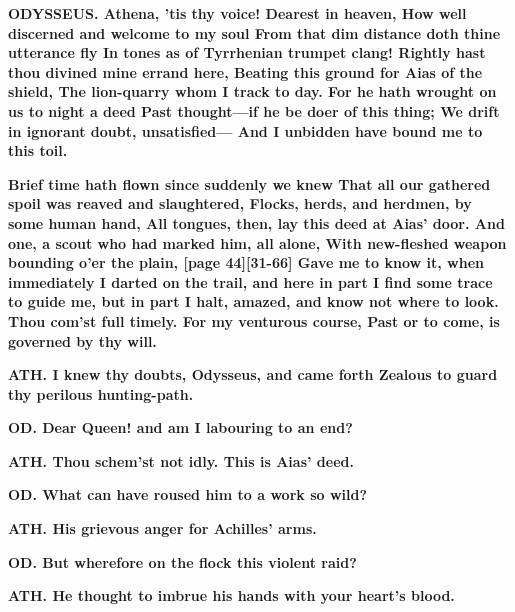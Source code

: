 \documentclass[11pt,letter]{book}
\begin{document}
\par \textbf{ODYSSEUS. Athena, ’tis thy voice! Dearest in heaven, How well discerned and welcome to my soul From that dim distance doth thine utterance fly In tones as of Tyrrhenian trumpet clang! Rightly hast thou divined mine errand here, Beating this ground for Aias of the shield, The lion-quarry whom I track to day. For he hath wrought on us to night a deed Past thought—if he be doer of this thing; We drift in ignorant doubt, unsatisfied— And I unbidden have bound me to this toil.}
\par 

\par \textbf{Brief time hath flown since suddenly we knew That all our gathered spoil was reaved and slaughtered, Flocks, herds, and herdmen, by some human hand, All tongues, then, lay this deed at Aias’ door. And one, a scout who had marked him, all alone, With new-fleshed weapon bounding o’er the plain, [page 44][31-66] Gave me to know it, when immediately I darted on the trail, and here in part I find some trace to guide me, but in part I halt, amazed, and know not where to look. Thou com’st full timely. For my venturous course, Past or to come, is governed by thy will.}
\par 

\par \textbf{ATH. I knew thy doubts, Odysseus, and came forth Zealous to guard thy perilous hunting-path.}
\par 

\par \textbf{OD. Dear Queen! and am I labouring to an end?}
\par 

\par \textbf{ATH. Thou schem’st not idly. This is Aias’ deed.}
\par 

\par \textbf{OD. What can have roused him to a work so wild?}
\par 

\par \textbf{ATH. His grievous anger for Achilles’ arms.}
\par 

\par \textbf{OD. But wherefore on the flock this violent raid?}
\par 

\par \textbf{ATH. He thought to imbrue his hands with your heart’s blood.}
\par 
\end{document}

